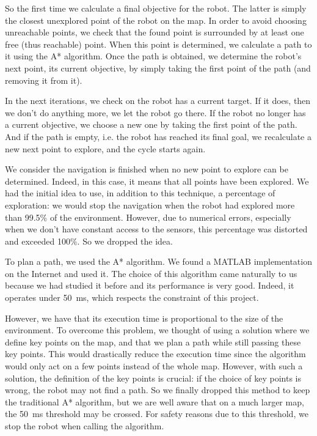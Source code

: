\documentclass[a4paper, 10pt, conference]{ieeeconf}
\begin{document}
    So the first time we calculate a final objective for the robot. The latter is simply the closest unexplored point of the robot on the map. In order to avoid choosing unreachable points, we check that the found point is surrounded by at least one free (thus reachable) point. When this point is determined, we calculate a path to it using the A* algorithm. Once the path is obtained, we determine the robot's next point, its current objective, by simply taking the first point of the path (and removing it from it).
    
    In the next iterations, we check on the robot has a current target. If it does, then we don't do anything more, we let the robot go there. If the robot no longer has a current objective, we choose a new one by taking the first point of the path. And if the path is empty, i.e. the robot has reached its final goal, we recalculate a new next point to explore, and the cycle starts again.
    
    We consider the navigation is finished when no new point to explore can be determined. Indeed, in this case, it means that all points have been explored. We had the initial idea to use, in addition to this technique, a percentage of exploration: we would stop the navigation when the robot had explored more than 99.5\% of the environment. However, due to numerical errors, especially when we don't have constant access to the sensors, this percentage was distorted and exceeded 100\%. So we dropped the idea.
    
    To plan a path, we used the A* algorithm. We found a MATLAB implementation on the Internet and used it. The choice of this algorithm came naturally to us because we had studied it before and its performance is very good. Indeed, it operates under \SI{50}{\milli\second}, which respects the constraint of this project.
    
    However, we have that its execution time is proportional to the size of the environment. To overcome this problem, we thought of using a solution where we define key points on the map, and that we plan a path while still passing these key points. This would drastically reduce the execution time since the algorithm would only act on a few points instead of the whole map. However, with such a solution, the definition of the key points is crucial: if the choice of key points is wrong, the robot may not find a path. So we finally dropped this method to keep the traditional A* algorithm, but we are well aware that on a much larger map, the \SI{50}{\milli\second} threshold may be crossed. For safety reasons due to this threshold, we stop the robot when calling the algorithm.
    
\end{document}
